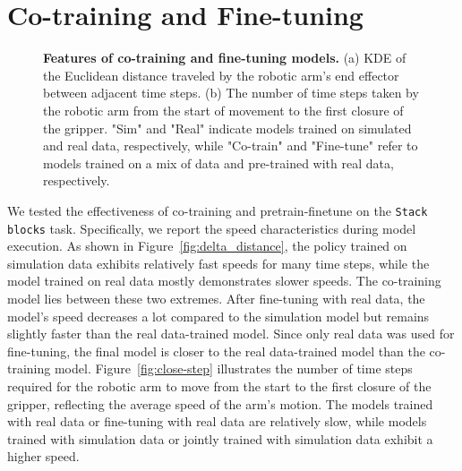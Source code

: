 

\section{Co-training and Fine-tuning}

\begin{figure}[h]
    \centering
    \caption{\textbf{Features of co-training and fine-tuning models.} (a) KDE of the Euclidean distance traveled by the robotic arm's end effector between adjacent time steps.  (b) The number of time steps taken by the robotic arm from the start of movement to the first closure of the gripper. "Sim" and "Real" indicate models trained on simulated and real data, respectively, while "Co-train" and "Fine-tune" refer to models trained on a mix of data and pre-trained with real data, respectively.}
    \label{fig:joint-funetune}
\end{figure}

We tested the effectiveness of co-training and pretrain-finetune on the \texttt{Stack blocks} task. Specifically, we report the speed characteristics during model execution. As shown in Figure~\ref{fig:delta_distance}, the policy trained on simulation data exhibits relatively fast speeds for many time steps, while the model trained on real data mostly demonstrates slower speeds. The co-training model lies between these two extremes. After fine-tuning with real data, the model’s speed decreases a lot compared to the simulation model but remains slightly faster than the real data-trained model. Since only real data was used for fine-tuning, the final model is closer to the real data-trained model than the co-training model.
Figure~\ref{fig:close-step} illustrates the number of time steps required for the robotic arm to move from the start to the first closure of the gripper, reflecting the average speed of the arm's motion. The models trained with real data or fine-tuning with real data are relatively slow, while models trained with simulation data or jointly trained with simulation data exhibit a higher speed. 

